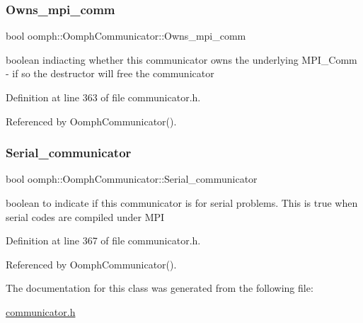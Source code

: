 \subsubsection{\texorpdfstring{Owns\+\_\+mpi\+\_\+comm}{Owns\_mpi\_comm}}
{\footnotesize\ttfamily bool oomph\+::\+Oomph\+Communicator\+::\+Owns\+\_\+mpi\+\_\+comm\hspace{0.3cm}{\ttfamily [private]}}



boolean indiacting whether this communicator owns the underlying M\+P\+I\+\_\+\+Comm -\/ if so the destructor will free the communicator 



Definition at line 363 of file communicator.\+h.



Referenced by Oomph\+Communicator().

\mbox{\label{classoomph_1_1OomphCommunicator_ab6e14f26e8effff948255e59d956d553}} 
\subsubsection{\texorpdfstring{Serial\+\_\+communicator}{Serial\_communicator}}
{\footnotesize\ttfamily bool oomph\+::\+Oomph\+Communicator\+::\+Serial\+\_\+communicator\hspace{0.3cm}{\ttfamily [private]}}



boolean to indicate if this communicator is for serial problems. This is true when serial codes are compiled under M\+PI 



Definition at line 367 of file communicator.\+h.



Referenced by Oomph\+Communicator().



The documentation for this class was generated from the following file\+:\begin{DoxyCompactItemize}
\item 
\hyperlink{communicator_8h}{communicator.\+h}\end{DoxyCompactItemize}
